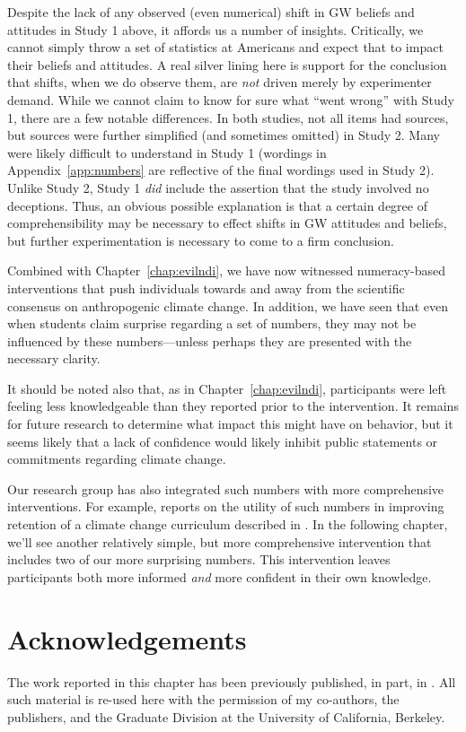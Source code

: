 Despite the lack of any observed (even numerical) shift in GW beliefs and
attitudes in Study 1 above, it affords us a number of insights.
Critically, we cannot simply throw a set of statistics at Americans and expect that
to impact their beliefs and attitudes. A real silver lining here is support for
the conclusion that shifts, when we do observe them, are \emph{not} driven
merely by experimenter demand. While we cannot claim to know for sure what “went
wrong” with Study 1, there are a few notable differences.  In both studies, not
all items had sources, but sources were further simplified (and sometimes
omitted) in Study 2. Many were likely difficult to understand in Study 1
(wordings in Appendix~\ref{app:numbers} are reflective of the final wordings
used in Study 2). Unlike Study 2, Study 1 \emph{did} include the assertion that
the study involved no deceptions. Thus, an obvious possible explanation is that a
certain degree of comprehensibility may be necessary to effect shifts in GW
attitudes and beliefs, but further experimentation is necessary to come to a firm
conclusion.

Combined with Chapter~\ref{chap:evilndi}, we have now witnessed numeracy-based
interventions that push individuals towards and away from the scientific
consensus on anthropogenic climate change. In addition, we have seen that even
when students claim surprise regarding a set of numbers, they may not be
influenced by these numbers---unless perhaps they are presented with the
necessary clarity.

It should be noted also that, as in Chapter~\ref{chap:evilndi}, participants were
left feeling less knowledgeable than they reported prior to the intervention. It
remains for future research to determine what impact this might have on
behavior, but it seems likely that a lack of confidence would likely
inhibit public statements or commitments regarding climate change.

Our research group has also integrated such numbers with  more comprehensive
interventions. For example, \textcite{clark_knowledge_inpress} reports on the
utility of such numbers in improving retention of a climate change curriculum
described in \textcite{felipe_numerical_2012}. In the following chapter, we'll
see another relatively simple, but more comprehensive intervention that includes two
of our more surprising numbers. This intervention leaves participants both more informed
\emph{and} more confident in their own knowledge.

\section*{Acknowledgements}

The work reported in this chapter has been previously published, in part, in
\textcite{clark_knowledge_inpress}.  All such material is re-used here with the
permission of my co-authors, the publishers, and the Graduate Division at the
University of California, Berkeley.
